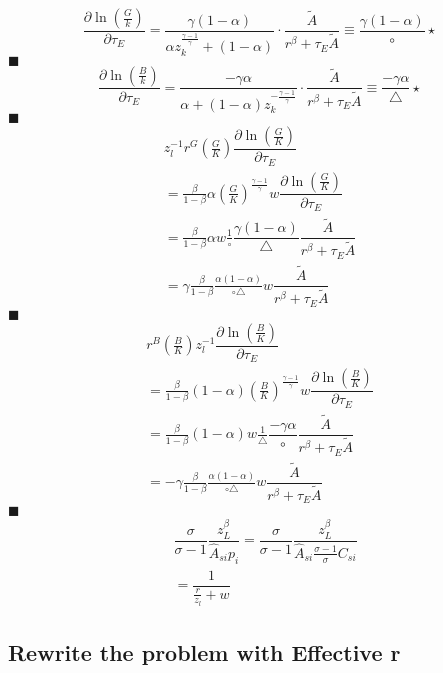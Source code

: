 \documentclass[12pt]{article} %
\begin{document}
\begin{equation*}
        \frac{\partial \ln \left(\frac{G}{k}\right)}{\partial \tau_E}=\frac{\gamma(1-\alpha)}{\alpha z_k^{\frac{\gamma-1}{\gamma}}+(1-\alpha)} \cdot \frac{\tilde{A}}{r^\beta+\tau_E \tilde{A}}	\equiv \frac{\gamma (1-\alpha)}{\circ}\star
\end{equation*}$\blacksquare$
\begin{equation*}
    \frac{\partial \ln \left(\frac{B}{k}\right)}{\partial \tau_E} = \frac{-\gamma\alpha}{\alpha +(1-\alpha)z_k^{-\frac{\gamma-1}{\gamma}}} \cdot \frac{\tilde{A}}{r^\beta+\tau_E \tilde{A}}	\equiv \frac{-\gamma \alpha}{\triangle}\star
\end{equation*}$\blacksquare$
\begin{eqnarray*}
    z_l^{-1}r^G (\frac{G}{K})\dfrac{ \partial \ln (\frac{G}{K}) }{\partial \tau_E} \\
   =\frac{\beta}{1-\beta}{\alpha} (\frac{G}{K})^{\frac{\gamma-1}{\gamma}}{w} \dfrac{ \partial \ln (\frac{G}{K}) }{\partial \tau_E} \\
   =\frac{\beta}{1-\beta}{\alpha}w \frac{1}{\circ}\dfrac{\gamma (1-\alpha)}{\triangle}\dfrac{\tilde{A}}{r^\beta+\tau_E \tilde{A}}\\
   = \gamma \frac{\beta}{1-\beta}\frac{\alpha(1-\alpha)}{\circ\triangle}w\dfrac{\tilde{A}}{r^\beta+\tau_E \tilde{A}} 
\end{eqnarray*}$\blacksquare$	
\begin{eqnarray*}
    r^B (\frac{B}{K})z_l^{-1}\dfrac{ \partial \ln (\frac{B}{K}) }{\partial \tau_E} \\
    = \frac{\beta}{1-\beta}{(1-\alpha)}(\frac{B}{K})^{\frac{\gamma-1}{\gamma}}w \dfrac{ \partial \ln (\frac{B}{K}) }{\partial \tau_E} \\ 
    = \frac{\beta}{1-\beta}{(1-\alpha)}w  \frac{1}{\triangle}\dfrac{-\gamma \alpha}{\circ}\dfrac{\tilde{A}}{r^\beta+\tau_E \tilde{A}}\\
    = -\gamma \frac{\beta}{1-\beta}\frac{\alpha(1-\alpha)}{\circ\triangle}w\dfrac{\tilde{A}}{r^\beta+\tau_E \tilde{A}}
\end{eqnarray*} $\blacksquare$
\begin{eqnarray*}
    &\dfrac{\sigma}{\sigma -1}\dfrac{z_L^{\beta}}{{\hat{A}_{si}}p_i} = \dfrac{\sigma}{\sigma -1} \dfrac{z_L^{\beta}}{\hat{A}_{si}\frac{\sigma -1}{\sigma} C_{si}}\\
    & = \dfrac{1}{\frac{r}{z_l} + w}
\end{eqnarray*}

\subsection*{Rewrite the problem with Effective r}
\end{document}

